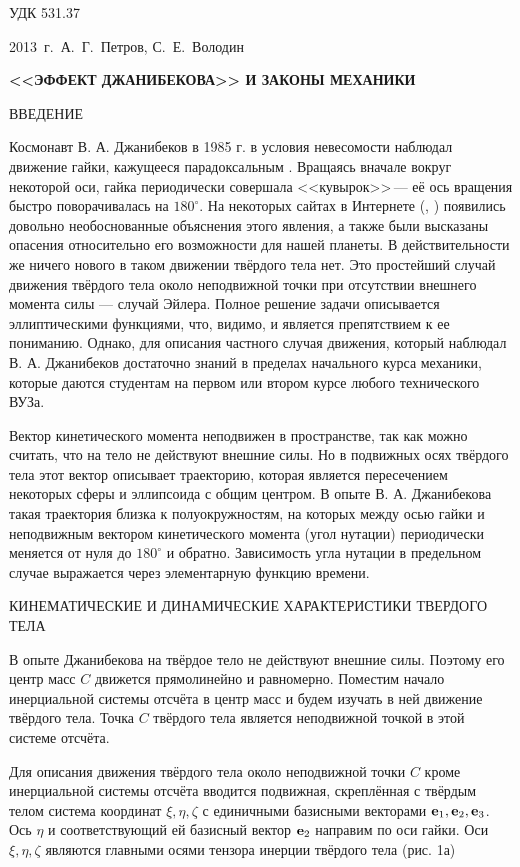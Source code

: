 \documentclass[14pt,a4paper]{extarticle}
\begin{document}
УДК 531.37

\smallskip


\centerline{2013~г.~{А.~Г.~Петров, С.~Е.~Володин}}

\smallskip

\centerline{\bf <<ЭФФЕКТ ДЖАНИБЕКОВА>> И ЗАКОНЫ МЕХАНИКИ}

\bigskip

ВВЕДЕНИЕ

Космонавт В. А. Джанибеков в 1985 г. в условия невесомости наблюдал  движение гайки, кажущееся парадоксальным \cite{video}. Вращаясь вначале вокруг некоторой оси, гайка периодически совершала <<кувырок>>\,--- её ось вращения быстро поворачивалась на $180^\circ$. На некоторых сайтах в Интернете (\cite{federalspace}, \cite{ixbt}) появились довольно необоснованные объяснения этого явления, а также были высказаны опасения относительно его возможности для нашей планеты. В действительности же ничего нового в таком движении твёрдого тела нет. Это простейший случай движения твёрдого тела около неподвижной точки при отсутствии внешнего момента силы --- случай Эйлера. Полное решение задачи описывается эллиптическими функциями, что, видимо, и является препятствием к ее пониманию. Однако, для описания частного случая движения, который наблюдал В. А. Джанибеков достаточно  знаний в пределах начального курса механики, которые даются студентам на первом или втором курсе любого технического ВУЗа.

Вектор кинетического момента неподвижен в пространстве, так как можно считать, что на тело не действуют внешние силы. Но в подвижных осях твёрдого тела этот вектор описывает траекторию, которая является пересечением некоторых сферы и эллипсоида с общим центром. В опыте В. А. Джанибекова такая траектория близка к полуокружностям, на которых между осью гайки и неподвижным вектором кинетического момента (угол нутации) периодически меняется от нуля до $180^\circ$ и обратно. Зависимость угла нутации в предельном случае выражается через элементарную функцию времени.

КИНЕМАТИЧЕСКИЕ И ДИНАМИЧЕСКИЕ ХАРАКТЕРИСТИКИ ТВЕРДОГО ТЕЛА

В опыте Джанибекова на твёрдое тело не действуют внешние силы. Поэтому его центр масс $C$ движется прямолинейно и равномерно. Поместим начало инерциальной системы отсчёта в центр масс и будем изучать в ней движение твёрдого тела. Точка $C$ твёрдого тела является неподвижной  точкой в этой системе отсчёта.

Для описания движения твёрдого тела около неподвижной точки $C$ кроме инерциальной системы отсчёта вводится подвижная, скреплённая с твёрдым телом система координат $\xi,\eta,\zeta$ с единичными базисными векторами ${\bf e}_1,{\bf e}_2,{\bf e}_3$. Ось $\eta$ и соответствующий ей базисный вектор ${\bf e}_2$ направим по оси гайки. Оси $\xi,\eta,\zeta$ являются главными осями тензора инерции твёрдого тела (рис. 1а)
\end{document}
